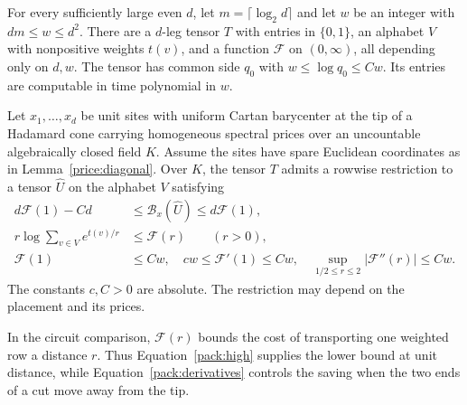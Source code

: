 \begin{theorem}\label{pack:witness}
For every sufficiently large even $d$, let $m=\lceil\log_2 d\rceil$
and let $w$ be an integer with $dm\le w\le d^2$. There are a $d$-leg
tensor $T$ with entries in $\{0,1\}$, an alphabet $V$ with
nonpositive weights $t(v)$, and a function $\mathcal F$ on
$(0,\infty)$, all depending only on $d,w$. The tensor has common side
$q_0$ with $w\le\log q_0\le Cw$. Its entries are computable in time
polynomial in $w$.

Let $x_1,\ldots,x_d$ be unit sites with uniform Cartan barycenter at
the tip of a Hadamard cone carrying homogeneous spectral prices over an
uncountable algebraically closed field $K$. Assume the sites have
spare Euclidean coordinates as in Lemma~\ref{price:diagonal}. Over
$K$, the tensor $T$ admits a rowwise restriction to a tensor
$\widehat U$ on the alphabet $V$ satisfying
\begin{align}
 d\mathcal F(1)-Cd &\le \mathcal B_x(\widehat U)\le d\mathcal F(1),\label{pack:high}\\
 r\log\sum_{v\in V} e^{t(v)/r}&\le \mathcal F(r) \qquad(r>0),\label{pack:partition}\\
 \mathcal F(1)&\le Cw,\quad c w\le \mathcal F'(1)\le Cw,\quad
 \sup_{1/2\le r\le2}|\mathcal F''(r)|\le Cw .\label{pack:derivatives}
\end{align}
The constants $c,C>0$ are absolute. The restriction may depend on the
placement and its prices.
\end{theorem}

In the circuit comparison, $\mathcal F(r)$ bounds the cost of
transporting one weighted row a distance $r$. Thus
Equation~\eqref{pack:high} supplies the lower bound at unit distance,
while Equation~\eqref{pack:derivatives} controls the saving when the
two ends of a cut move away from the tip.

